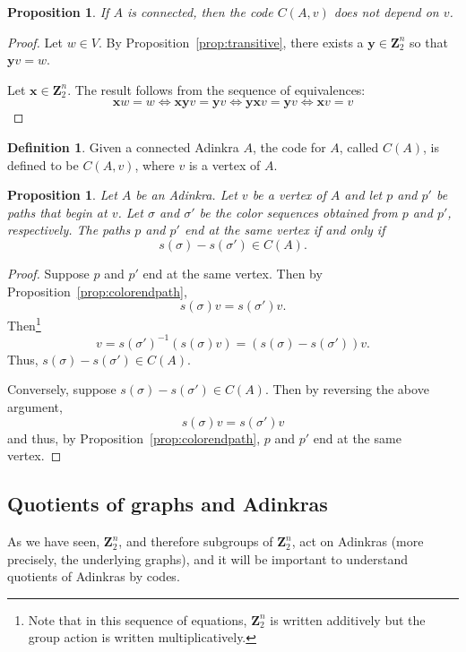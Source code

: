 \documentclass[12pt,twoside,singlespace]{article}
\numberwithin{equation}{section}
\newtheorem{prop}[equation]{Proposition}
\theoremstyle{definition}
\newtheorem{definition}[equation]{Definition}
\newcommand{\ZZ}{\mathbf{Z}}
\renewcommand{\vec}[1]{\mathbf{#1}}
\begin{document}
\begin{prop}
If $A$ is connected, then the code $C(A,v)$ does not depend on $v$.
\end{prop}
\begin{proof}
Let $w\in V$.  By Proposition~\ref{prop:transitive}, there exists a $\vec{y}\in \ZZ_2^n$ so that $\vec{y} v=w$.

Let $\vec{x}\in \ZZ_2^n$.  The result follows from the sequence of equivalences:
\[\vec{x} w=w\Leftrightarrow \vec{x}\vec{y} v=\vec{y} v \Leftrightarrow \vec{y} \vec{x} v=\vec{y} v \Leftrightarrow \vec{x} v=v\]
\end{proof}

\begin{definition}
Given a connected Adinkra $A$, the code for $A$, called $C(A)$, is defined to be $C(A,v)$, where $v$ is a vertex of $A$.
\end{definition}




\begin{prop}
\label{prop:paths}
Let $A$ be an Adinkra.  Let $v$ be a vertex of $A$ and let $p$ and $p'$ be paths that begin at $v$.  Let $\sigma$ and $\sigma'$ be the color sequences obtained from $p$ and $p'$, respectively.  The paths $p$ and $p'$ end at the same vertex if and only if 
\[s(\sigma)-s(\sigma')\in C(A).\]
\end{prop}

\begin{proof}
Suppose $p$ and $p'$ end at the same vertex.  Then by Proposition~\ref{prop:colorendpath},
\[s(\sigma)v=s(\sigma')v.\]
Then\footnote{Note that in this sequence of equations, $\ZZ_2^n$ is written additively but the group action is written multiplicatively.}
\[v=s(\sigma')^{-1}(s(\sigma)v)=(s(\sigma)-s(\sigma'))v.\]
Thus, $s(\sigma)-s(\sigma')\in C(A)$.

Conversely, suppose $s(\sigma)-s(\sigma')\in C(A)$.  Then by reversing the above argument,
\[s(\sigma)v=s(\sigma')v\]
and thus, by Proposition~\ref{prop:colorendpath}, $p$ and $p'$ end at the same vertex.
\end{proof}

\subsection{Quotients of graphs and Adinkras}
\label{sec:quotient}
As we have seen, $\ZZ_2^n$, and therefore subgroups of $\ZZ_2^n$, act on Adinkras (more precisely, the underlying graphs), and it will be important to understand quotients of Adinkras by codes.
\end{document}
